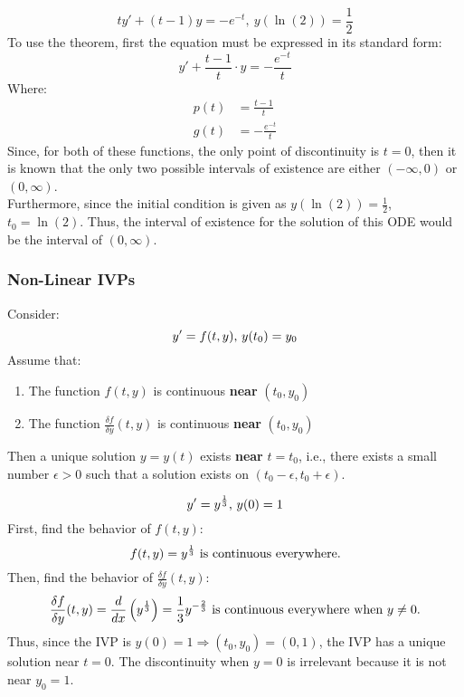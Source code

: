 \documentclass[12pt]{article}
\begin{document}
\begin{example}
  \begin{equation*}
    ty' + (t-1)y = -e^{-t},\ y\left(\ln(2)\right) = \frac{1}{2}
  \end{equation*}
  To use the theorem, first the equation must be expressed in its standard form:
  \begin{equation*}
    y' + \frac{t-1}{t}\cdot y = -\frac{e^{-t}}{t}
  \end{equation*}
  Where:
  \begin{align*}
    p(t) &= \frac{t-1}{t} \\
    g(t) &= -\frac{e^{-t}}{t}
  \end{align*}
  Since, for both of these functions, the only point of discontinuity is $t=0$, then it is known that the only two possible intervals of existence are either $(-\infty,0)$ or $(0,\infty)$. \\

  Furthermore, since the initial condition is given as $y\left(\ln(2)\right) = \frac{1}{2}$, $t_0 = \ln(2)$. Thus, the interval of existence for the solution of this ODE would be the interval of $(0,\infty)$.
\end{example}

\subsubsection{Non-Linear IVPs}
\label{sssec:nonLinearIVPs}

Consider:
\begin{equation*}
  y' = f(t,y)\textup{,}\ y(t_0) = y_0
\end{equation*}
Assume that:
\begin{enumerate}
  \itemsep0em
  \item The function $f(t,y)$ is continuous \textbf{near} $(t_0,y_0)$
  \item The function $\frac{\delta f}{\delta y}(t,y)$ is continuous \textbf{near} $(t_0,y_0)$
\end{enumerate}
Then a unique solution $y=y(t)$ exists \textbf{near} $t=t_0$, i.e., there exists a small number $\epsilon > 0$ such that a solution exists on $(t_0-\epsilon,t_0+\epsilon)$.

\begin{example}
  \begin{equation*}
    y' = y^{\frac{1}{3}}\textup{,}\ y(0) = 1
  \end{equation*}
  First, find the behavior of $f(t,y)$:
  \begin{equation*}
    f(t,y) = y^{\frac{1}{3}}\ \textup{is continuous everywhere.}
  \end{equation*}
  Then, find the behavior of $\frac{\delta f}{\delta y}(t,y)$:
  \begin{equation*}
    \frac{\delta f}{\delta y}(t,y) = \frac{d}{dx}\left(y^{\frac{1}{3}}\right) = \frac{1}{3}y^{-\frac{2}{3}}\ \textup{is continuous everywhere when $y\neq0$.}
  \end{equation*}
  Thus, since the IVP is $y(0)=1 \Rightarrow (t_0,y_0) = (0,1)$, the IVP has a unique solution near $t=0$. The discontinuity when $y=0$ is irrelevant because it is not near $y_0=1$.
\end{example}
\end{document}
